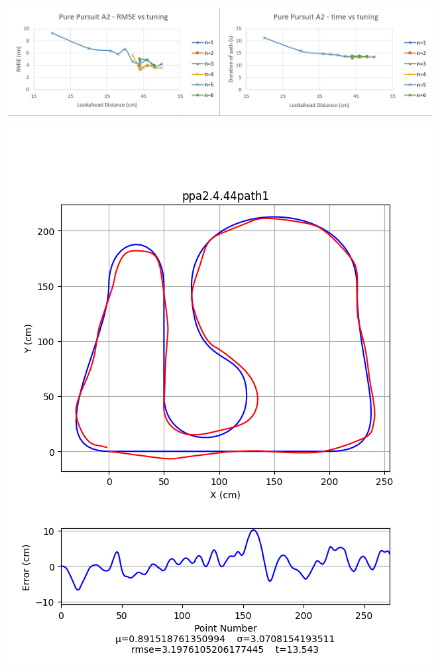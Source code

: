 \documentclass[mla8alt]{mla}
\begin{document}
\begin{paper}
\begin{figure}[H]
\includegraphics[width=\linewidth]{tuningGraphs/ppa2}
\includegraphics[width=\linewidth]{pathData/ppa2path1}
\endminipage\hfill
{}

\end{figure}
\end{paper}
\end{document}
